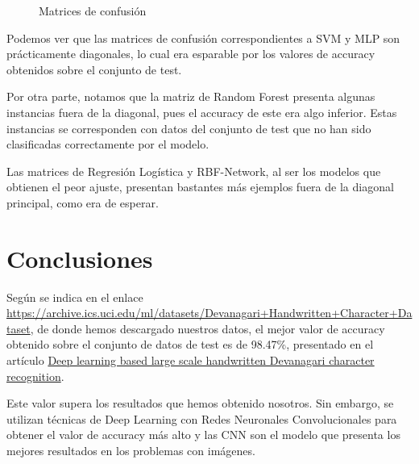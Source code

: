 \documentclass[a4]{article}
\begin{document}
\begin{figure}[H]
	\caption{Matrices de confusión}
	\label{fig:matrices_confusion}
\end{figure}


Podemos ver que las matrices de confusión correspondientes a SVM y MLP son prácticamente diagonales, lo cual era esparable por los valores de accuracy    obtenidos sobre el conjunto de test. 

Por otra parte, notamos que la matriz de Random Forest presenta algunas instancias fuera de la diagonal, pues el accuracy de este era algo inferior. Estas instancias se corresponden con datos del conjunto de test que no han sido clasificadas correctamente por el modelo. 

Las matrices de Regresión Logística y RBF-Network, al ser los modelos que obtienen el peor ajuste, presentan bastantes más ejemplos fuera de la diagonal principal, como era de esperar.


\section{Conclusiones}

Según se indica en el enlace \href{https://archive.ics.uci.edu/ml/datasets/Devanagari+Handwritten+Character+Dataset}{https://archive.ics.uci.edu/ml/datasets/Devanagari+Handwritten+Character+Dataset}, de donde hemos descargado nuestros datos, el mejor valor de accuracy obtenido sobre el conjunto de datos de test es de 98.47\%, presentado en el artículo \href{https://ieeexplore.ieee.org/stamp/stamp.jsp?tp=&arnumber=7400041}{Deep learning based large scale handwritten Devanagari character recognition}.

Este valor supera los resultados que hemos obtenido nosotros. Sin embargo, se utilizan técnicas de Deep Learning con Redes Neuronales Convolucionales para obtener el valor de accuracy más alto y las CNN son el modelo que presenta los mejores resultados en los problemas con imágenes. 
\end{document}
